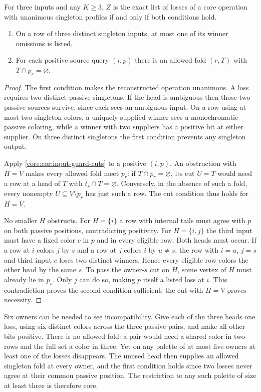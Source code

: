 \begin{proposition}
\label{core:prop:ternary-fold-transversals}
For three inputs and any $K\ge3$, $Z$ is the exact list of losses of
a core operation with unanimous singleton profiles if and only if
both conditions hold.
\begin{enumerate}
\item On a row of three distinct singleton inputs, at most one of its
winner omissions is listed.
\item For each positive source query $(i,p)$ there is an allowed
fold $(r,T)$ with $T\cap p_r=\varnothing$.
\end{enumerate}
\end{proposition}
\begin{proof}
The first condition makes the reconstructed operation unanimous. A
loss requires two distinct passive singletons. If the head is ambiguous
then those two passive sources survive, since each sees an ambiguous
input. On a row using at most two singleton colors, a uniquely
supplied winner sees a monochromatic passive coloring, while a winner
with two suppliers has a positive bit at either supplier. On three
distinct singletons the first condition prevents any singleton output.

Apply \cref{core:cor:input-guard-cuts} to a positive $(i,p)$.
An obstruction with $H=V$ makes every allowed fold meet $p_r$:
if $T\cap p_r=\varnothing$, its cut $U=T$ would need a row at a
head of $T$ with $t_r\cap T=\varnothing$. Conversely, in the absence
of such a fold, every nonempty $U\subseteq V\setminus p_r$ has just
such a row. The cut condition thus holds for $H=V$.

No smaller $H$ obstructs. For $H=\{i\}$ a row with internal tails
must agree with $p$ on both passive positions, contradicting positivity.
For $H=\{i,j\}$ the third input must have a fixed color $c$ in $p$
and in every eligible row. Both heads must occur. If a row at $i$
colors $j$ by $s$ and a row at $j$ colors $i$ by $u\ne s$, the row
with $i=u$, $j=s$ and third input $c$ loses two distinct winners.
Hence every eligible row colors the other head by the same $s$.
To pass the owner-$s$ cut on $H$, some vertex of $H$ must already
lie in $p_s$. Only $j$ can do so, making $p$ itself a listed loss
at $i$. This contradiction proves the second condition sufficient;
the cut with $H=V$ proves necessity.
\end{proof}

Six owners can be needed to see incompatibility. Give each of the
three heads one loss, using six distinct colors across the three
passive pairs, and make all other bits positive. There is no allowed
fold: a pair would need a shared color in two rows and the full set
a color in three. Yet on any palette of at most five owners at least
one of the losses disappears. The unused head then supplies an allowed
singleton fold at every owner, and the first condition holds since two
losses never agree at their common passive position. The restriction
to any such palette of size at least three is therefore core.

